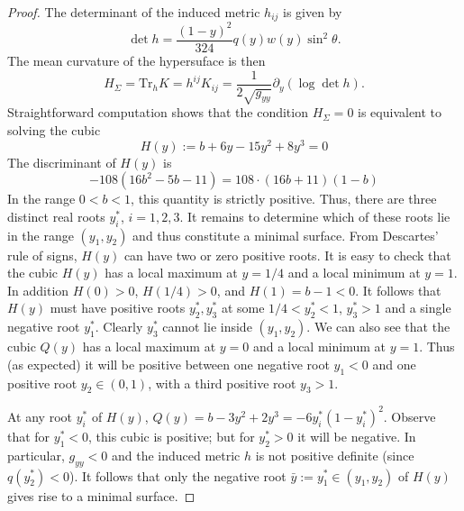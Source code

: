 \documentclass[11pt]{amsart}
\theoremstyle{plain}
\theoremstyle{definition}
\numberwithin{equation}{section}
\begin{document}
\begin{proof} The determinant of the induced metric $h_{ij}$ is given by
\begin{equation}
\det h = \frac{(1-y)^2}{324} q(y) w(y) \sin^2\theta.
\end{equation} The mean curvature of the hypersuface is then 
\begin{equation}
    H_\Sigma = \text{Tr}_h K = h^{ij}K_{ij} = \frac{1}{2\sqrt{g_{yy}}} \partial_y (\log \det h).
\end{equation} Straightforward computation shows that the condition $H_\Sigma=0$ is equivalent to solving the cubic
\begin{equation}
    H(y):=b + 6 y - 15 y^2 + 8 y^3 =0
\end{equation}  The discriminant of $H(y)$ is 
\begin{equation}
    -108 \left(16 b^2-5b - 11\right) = 108 \cdot  \left(16 b + 11\right)(1-b)
\end{equation} In the range $0 < b < 1$, this quantity is strictly positive. Thus, there are three distinct real roots $y^*_i$, $i=1,2,3$. It remains to determine which of these roots lie in the range $(y_1, y_2)$ and thus constitute a minimal surface. From Descartes' rule of signs, $H(y)$ can have two or zero positive roots. It is easy to check that the cubic $H(y)$ has a local maximum at $y = 1/4$ and a local minimum at $y = 1$. In addition $H(0) >0$, $H(1/4) > 0$, and $H(1) = b-1 < 0$. It follows that $H(y)$ must have positive roots $y_2^*, y_3^*$ at some $1/4 < y_2^* < 1$, $y_3^* > 1$ and a single negative root $y_1^*$. Clearly $y_3^*$ cannot lie inside $(y_1,y_2)$. We can also see that the cubic $Q(y)$ has a local maximum at $y = 0$ and a local minimum at $y = 1$. Thus (as expected) it will be positive between one negative root $y_1 <0$ and one positive root $y_2 \in (0,1)$, with a third positive root $y_3>1$. 

At any root $y_i^*$ of $H(y)$,  $Q(y) = b - 3y^2 + 2y^3 = -6 y_i^{*}(1 - y_i^{*})^2$. Observe that for $y_1^* < 0$, this cubic is positive; but for $y^*_2 > 0$ it will be negative. In particular, $g_{yy} < 0$ and the induced metric $h$ is not positive definite (since $q(y^*_2) < 0$). It follows that only the negative root $\bar{y}:=y_1^* \in (y_1,y_2)$ of $H(y)$ gives rise to a minimal surface. 
\end{proof}
\end{document}

